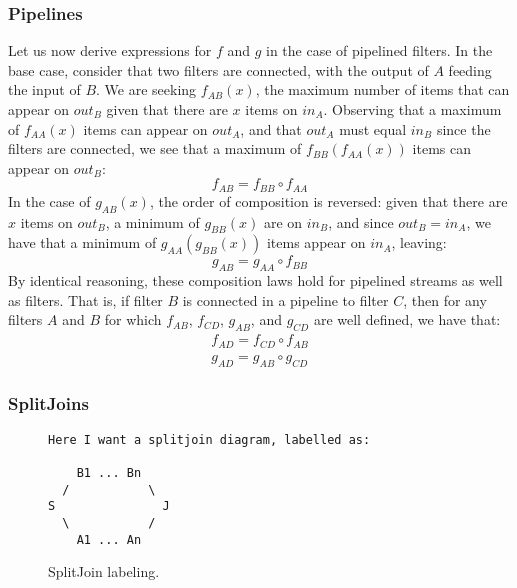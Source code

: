 \subsubsection{Pipelines}

Let us now derive expressions for $f$ and $g$ in the case of pipelined
filters.  In the base case, consider that two filters are connected,
with the output of $A$ feeding the input of $B$.  We are seeking
$f_{AB}(x)$, the maximum number of items that can appear on $out_B$
given that there are $x$ items on $in_A$.  Observing that a maximum of
$f_{AA}(x)$ items can appear on $out_A$, and that $out_A$ must equal
$in_B$ since the filters are connected, we see that a maximum of
$f_{BB}(f_{AA}(x))$ items can appear on $out_B$:
\begin{equation*}
f_{AB} = f_{BB} \circ f_{AA}
\end{equation*}
In the case of $g_{AB}(x)$, the order of composition is reversed:
given that there are $x$ items on $out_B$, a minimum of $g_{BB}(x)$
are on $in_B$, and since $out_B = in_A$, we have that a minimum of
$g_{AA}(g_{BB}(x))$ items appear on $in_A$, leaving:
\begin{equation*}
g_{AB} = g_{AA} \circ f_{BB}
\end{equation*}
By identical reasoning, these composition laws hold for pipelined
streams as well as filters.  That is, if filter $B$ is connected in a
pipeline to filter $C$, then for any filters $A$ and $B$ for which
$f_{AB}$, $f_{CD}$, $g_{AB}$, and $g_{CD}$ are well defined, we have that:
\begin{eqnarray*}
f_{AD} = f_{CD} \circ f_{AB} \\
g_{AD} = g_{AB} \circ g_{CD}
\end{eqnarray*}

\subsubsection{SplitJoins}

\begin{figure}[t]
\scriptsize
\begin{verbatim}
Here I want a splitjoin diagram, labelled as:

    B1 ... Bn 
  /           \
S               J
  \           /
    A1 ... An

\end{verbatim}
\vspace{-12pt}
\caption{\protect\small SplitJoin labeling.
\protect\label{splitjoin}}
\vspace{-12pt}
\end{figure}

